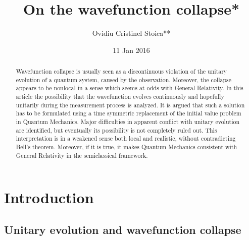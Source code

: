 \documentclass[12pt]{amsart}
\title{On the wavefunction collapse*}
\author{Ovidiu Cristinel Stoica**}
\date{11 Jan 2016}
\theoremstyle{definition}
\theoremstyle{plain}
\begin{document}
\begin{abstract}
Wavefunction collapse is usually seen as a discontinuous violation of the unitary evolution of a quantum system, caused by the observation. Moreover, the collapse appears to be nonlocal in a sense which seems at odds with General Relativity. In this article the possibility that the wavefunction evolves continuously and hopefully unitarily during the measurement process is analyzed. It is argued that such a solution has to be formulated using a time symmetric replacement of the initial value problem in Quantum Mechanics. Major difficulties in apparent conflict with unitary evolution are identified, but eventually its possibility is not completely ruled out. This interpretation is in a weakened sense both local and realistic, without contradicting Bell's theorem. Moreover, if it is true, it makes Quantum Mechanics consistent with General Relativity in the semiclassical framework.
\end{abstract}

\maketitle

\section{Introduction}
\label{s:intro}

\subsection{Unitary evolution and wavefunction collapse}
\label{s:standardQM}
\end{document}
